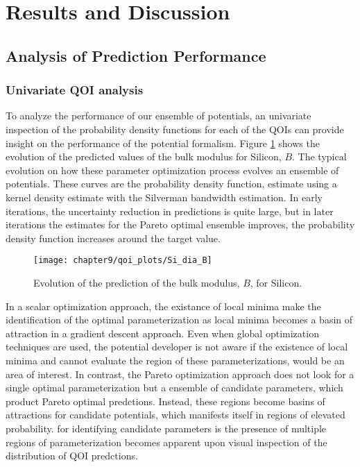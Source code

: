 \section{Results and Discussion}

\subsection{Analysis of Prediction Performance}
\subsubsection{Univariate QOI analysis}
To analyze the performance of our ensemble of potentials, an univariate inspection of the probability density functions for each of the QOIs can provide insight on the performance of the potential formalism.
Figure \ref{fig:Si_qoi_B} shows the evolution of the predicted values of the bulk modulus for Silicon, $B$.  The typical evolution on how these parameter optimization process evolves an ensemble of potentials.  
These curves are the probability density function, estimate using a kernel density estimate with the Silverman bandwidth estimation.  
In early iterations, the uncertainty reduction in predictions is quite large, but in later iterations the estimates for the Pareto optimal ensemble improves, the probability density function increases around the target value.

\begin{figure}[h]
	\centering
	\texttt{[image: chapter9/qoi\_plots/Si\_dia\_B]}
	\caption{Evolution of the prediction of the bulk modulus, $B$, for Silicon.}
	\label{fig:Si_qoi_B}
\end{figure}

In a scalar optimization approach, the existance of local minima make the identification of the optimal parameterization as local minima becomes a basin of attraction in a gradient descent approach.
Even when global optimization techniques are used, the potential developer is not aware if the existence of local minima and cannot evaluate the region of these parameterizations, would be an area of interest.
In contrast, the Pareto optimization approach does not look for a single optimal parameterization but a ensemble of candidate parameters, which product Pareto optimal predctions.
Instead, these regions become basins of attractions for candidate potentials, which manifests itself in regions of elevated probability.
for identifying candidate parameters is the presence of multiple regions of parameterization becomes apparent upon visual inspection of the distribution of QOI predctions.

